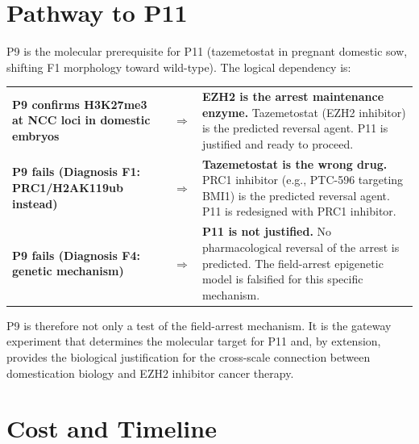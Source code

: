 \documentclass[10pt, a4paper]{article}
\begin{document}
\section{Pathway to P11}
\label{sec:p11}

P9 is the molecular prerequisite for P11
(tazemetostat in pregnant domestic sow,
shifting F1 morphology toward wild-type).
The logical dependency is:

\vspace{0.3em}
\begin{center}
\small
\begin{tabular}{p{4.5cm}p{0.5cm}p{8.0cm}}
\textbf{P9 confirms H3K27me3 at NCC loci
in domestic embryos} &
$\Rightarrow$ &
\textbf{EZH2 is the arrest maintenance
enzyme.}
Tazemetostat (EZH2 inhibitor) is the
predicted reversal agent.
P11 is justified and ready to proceed. \\[0.5em]
\textbf{P9 fails (Diagnosis F1:
PRC1/H2AK119ub instead)} &
$\Rightarrow$ &
\textbf{Tazemetostat is the wrong drug.}
PRC1 inhibitor (e.g., PTC-596 targeting
BMI1) is the predicted reversal agent.
P11 is redesigned with PRC1 inhibitor. \\[0.5em]
\textbf{P9 fails (Diagnosis F4:
genetic mechanism)} &
$\Rightarrow$ &
\textbf{P11 is not justified.}
No pharmacological reversal of the
arrest is predicted. The field-arrest
epigenetic model is falsified for
this specific mechanism.
\end{tabular}
\end{center}

\vspace{0.3em}
P9 is therefore not only a test of the
field-arrest mechanism. It is the gateway
experiment that determines the molecular
target for P11 and, by extension, provides
the biological justification for the
cross-scale connection between domestication
biology and EZH2 inhibitor cancer therapy.

\section{Cost and Timeline}
\label{sec:cost}
\end{document}
